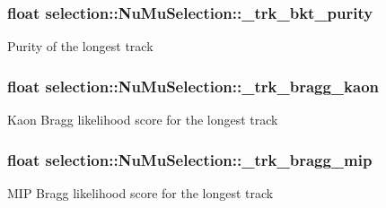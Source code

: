 \subsubsection[{\texorpdfstring{\+\_\+trk\+\_\+bkt\+\_\+purity}{_trk_bkt_purity}}]{\setlength{\rightskip}{0pt plus 5cm}float selection\+::\+Nu\+Mu\+Selection\+::\+\_\+trk\+\_\+bkt\+\_\+purity\hspace{0.3cm}{\ttfamily [private]}}\hypertarget{classselection_1_1NuMuSelection_a72c22e0de99d58873fa4e9824e094c50}{}\label{classselection_1_1NuMuSelection_a72c22e0de99d58873fa4e9824e094c50}
Purity of the longest track 
\subsubsection[{\texorpdfstring{\+\_\+trk\+\_\+bragg\+\_\+kaon}{_trk_bragg_kaon}}]{\setlength{\rightskip}{0pt plus 5cm}float selection\+::\+Nu\+Mu\+Selection\+::\+\_\+trk\+\_\+bragg\+\_\+kaon\hspace{0.3cm}{\ttfamily [private]}}\hypertarget{classselection_1_1NuMuSelection_a8fb54244ae254a42f6238bca2d7fb34e}{}\label{classselection_1_1NuMuSelection_a8fb54244ae254a42f6238bca2d7fb34e}
Kaon Bragg likelihood score for the longest track 
\subsubsection[{\texorpdfstring{\+\_\+trk\+\_\+bragg\+\_\+mip}{_trk_bragg_mip}}]{\setlength{\rightskip}{0pt plus 5cm}float selection\+::\+Nu\+Mu\+Selection\+::\+\_\+trk\+\_\+bragg\+\_\+mip\hspace{0.3cm}{\ttfamily [private]}}\hypertarget{classselection_1_1NuMuSelection_acf6657ef58eba53a46c0a8c9057ff170}{}\label{classselection_1_1NuMuSelection_acf6657ef58eba53a46c0a8c9057ff170}
M\+IP Bragg likelihood score for the longest track 
